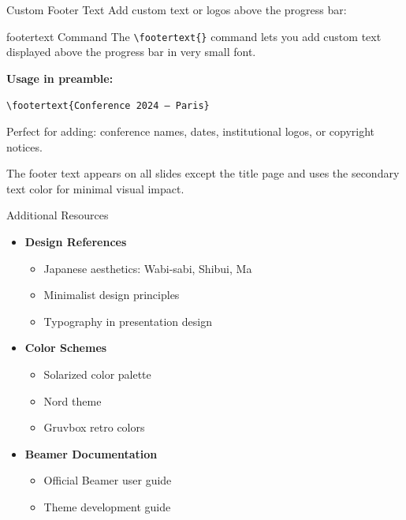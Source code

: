 \documentclass[aspectratio=169]{beamer}
\begin{document}
\begin{frame}{Custom Footer Text}
  Add custom text or logos above the progress bar:

  \vspace{0.5em}

  \begin{shibuiframe}{footertext Command}
    The \texttt{\textbackslash footertext\{\}} command lets you add custom text displayed above the progress bar in very small font.

    \vspace{0.3em}

    \textbf{Usage in preamble:}

    \texttt{\textbackslash footertext\{Conference 2024 -- Paris\}}

    \vspace{0.3em}

    Perfect for adding: conference names, dates, institutional logos, or copyright notices.
  \end{shibuiframe}

  \vspace{0.3em}

  The footer text appears on all slides except the title page and uses the secondary text color for minimal visual impact.
\end{frame}

\begin{frame}{Additional Resources}
  \begin{itemize}
    \item \textbf{Design References}
      \begin{itemize}
        \item Japanese aesthetics: Wabi-sabi, Shibui, Ma
        \item Minimalist design principles
        \item Typography in presentation design
      \end{itemize}

    \vspace{0.5em}

    \item \textbf{Color Schemes}
      \begin{itemize}
        \item Solarized color palette
        \item Nord theme
        \item Gruvbox retro colors
      \end{itemize}

    \vspace{0.5em}

    \item \textbf{Beamer Documentation}
      \begin{itemize}
        \item Official Beamer user guide
        \item Theme development guide
      \end{itemize}
  \end{itemize}
\end{frame}
\end{document}
